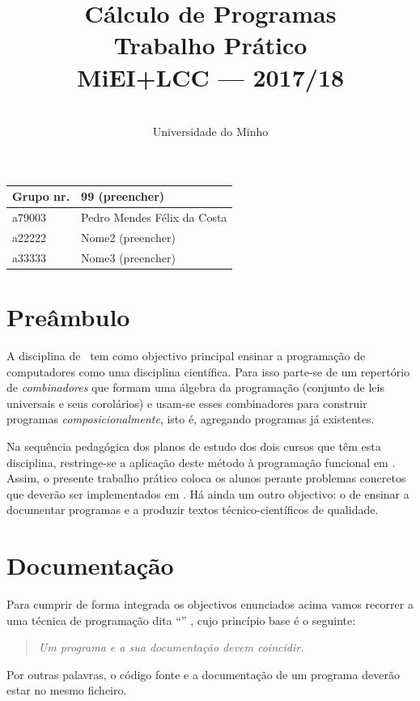 \documentclass[a4paper]{article}
\title{
       	    Cálculo de Programas
\\
       	Trabalho Prático
\\
       	MiEI+LCC --- 2017/18
}
\author{
       	\dium
\\
       	Universidade do Minho
}
\date\mydate
\begin{document}
\maketitle

\begin{center}\large
\begin{tabular}{ll}
\textbf{Grupo} nr. & 99 (preencher)
\\\hline
a79003 & Pedro Mendes Félix da Costa
\\
a22222 & Nome2 (preencher)
\\
a33333 & Nome3 (preencher)
\end{tabular}
\end{center}

\section{Preâmbulo}

A disciplina de \CP\ tem como objectivo principal ensinar
a progra\-mação de computadores como uma disciplina científica. Para isso
parte-se de um repertório de \emph{combinadores} que formam uma álgebra da
programação (conjunto de leis universais e seus corolários) e usam-se esses
combinadores para construir programas \emph{composicionalmente}, isto é,
agregando programas já existentes.

Na sequência pedagógica dos planos de estudo dos dois cursos que têm esta
disciplina, restringe-se a aplicação deste método à programação funcional
em \Haskell. Assim,
o presente trabalho prático coloca os alunos perante problemas
concretos que deverão ser implementados em \Haskell.
Há ainda um outro objectivo: o de ensinar a documentar programas e
a produzir textos técnico-científicos de qualidade.

\section{Documentação}
Para cumprir de forma integrada os objectivos enunciados acima vamos recorrer
a uma técnica de programa\-ção dita ``'' \cite{Kn92}, cujo
princípio base é o seguinte:
\begin{quote}\em
Um programa e a sua documentação devem coincidir.
\end{quote}
Por outras palavras, o código fonte e a documentação de um programa deverão estar no
mesmo ficheiro.
\end{document}
